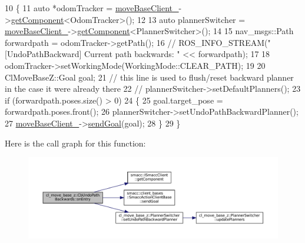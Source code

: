 \begin{DoxyCode}
10 \{
11   \textcolor{keyword}{auto} *odomTracker = \hyperlink{classcl__move__base__z_1_1CbMoveBaseClientBehaviorBase_ab2ef219464cfac8659b4a87c8d0db6d5}{moveBaseClient\_}->\hyperlink{classsmacc_1_1ISmaccClient_adef78db601749ca63c19e74a27cb88cc}{getComponent}<OdomTracker>();
12 
13   \textcolor{keyword}{auto} plannerSwitcher = \hyperlink{classcl__move__base__z_1_1CbMoveBaseClientBehaviorBase_ab2ef219464cfac8659b4a87c8d0db6d5}{moveBaseClient\_}->\hyperlink{classsmacc_1_1ISmaccClient_adef78db601749ca63c19e74a27cb88cc}{getComponent}<PlannerSwitcher>();
14 
15   nav\_msgs::Path forwardpath = odomTracker->getPath();
16   \textcolor{comment}{// ROS\_INFO\_STREAM("[UndoPathBackward] Current path backwards: " << forwardpath);}
17 
18   odomTracker->setWorkingMode(WorkingMode::CLEAR\_PATH);
19 
20   ClMoveBaseZ::Goal goal;
21   \textcolor{comment}{// this line is used to flush/reset backward planner in the case it were already there}
22   \textcolor{comment}{// plannerSwitcher->setDefaultPlanners();}
23   \textcolor{keywordflow}{if} (forwardpath.poses.size() > 0)
24   \{
25     goal.target\_pose = forwardpath.poses.front();
26     plannerSwitcher->setUndoPathBackwardPlanner();
27     \hyperlink{classcl__move__base__z_1_1CbMoveBaseClientBehaviorBase_ab2ef219464cfac8659b4a87c8d0db6d5}{moveBaseClient\_}->\hyperlink{classsmacc_1_1client__bases_1_1SmaccActionClientBase_a9c47a5094ac8afb01680307fe5eca922}{sendGoal}(goal);
28   \}
29 \}
\end{DoxyCode}
Here is the call graph for this function\+:
\nopagebreak
\begin{figure}[H]
\begin{center}
\leavevmode
\includegraphics[width=350pt]{classcl__move__base__z_1_1CbUndoPathBackwards_a32e680530375b62c7053bf173f6b2b1b_cgraph}
\end{center}
\end{figure}
\mbox{\label{classcl__move__base__z_1_1CbUndoPathBackwards_a20cee921ad92db16f8d17c3c3b9c2daf}} 
